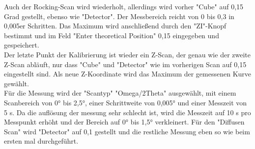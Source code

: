 Auch der Rocking-Scan wird wiederholt, allerdings wird vorher "Cube" auf 0,15 Grad gestellt, ebenso wie "Detector".
Der Messbereich reicht von 0 bis 0,3 in 0,005er Schritten. Das Maximum wird anschließend durch den "ZI"-Knopf bestimmt 
und im Feld "Enter theoretical Position" 0,15 eingegeben und gespeichert.\\

Der letzte Punkt der Kalibrierung ist wieder ein Z-Scan, der genau wie der zweite Z-Scan abläuft, 
nur dass "Cube" und "Detector" wie im vorherigen Scan auf 0,15 eingestellt sind.
Als neue Z-Koordinate wird das Maximum der gemessenen Kurve gewählt.\\

Für die Messung wird der "Scantyp" "Omega/2Theta" ausgewählt, mit einem Scanbereich von 0° bis 2,5°, einer Schrittweite von 0,005° und einer 
Messzeit von 5 s. Da die auflösung der messung sehr schlecht ist, wird die Messzeit auf 10 s pro Messpunkt erhöht und der Bereich auf 0° bis 1,5° verkleinert.
Für den "Diffusen Scan" wird "Detector" auf 0,1 gestellt und die restliche Messung eben so wie beim ersten mal durchgeführt.



